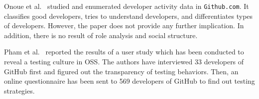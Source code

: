 Onoue et al.~\cite{onoue_study_2013} studied and enumerated developer activity
data in \texttt{Github.com}.
It classifies good developers, tries to understand developers, and
differentiates types of developers. However, the paper does not provide any
further implication. In addition, there is no result of role analysis and 
social structure.

Pham et al.~\cite{pham_creating_2013} reported the results of a user study which
has been conducted to reveal a testing culture in OSS. The authors have
interviewed 33 developers of GitHub first and figured out the transparency of
testing behaviors. Then, an online questionnaire has been sent to 569 developers
of GitHub to find out testing strategies.
